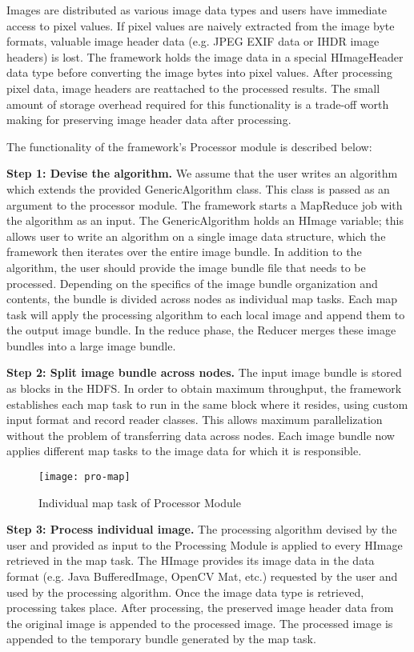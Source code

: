 Images are distributed as various image data types and users have
immediate access to pixel values.  If pixel values are naively
extracted from the image byte formats, valuable image header data
(e.g. JPEG EXIF data or IHDR \cite{David03} image headers) is
lost. The framework holds the image data in a special HImageHeader
data type before converting the image bytes into pixel values.  After
processing pixel data, image headers are reattached to the processed
results.  The small amount of storage overhead required for this
functionality is a trade-off worth making for preserving
image header data after processing.

The functionality of the framework's Processor module is described
below:

\textbf{Step 1: Devise the algorithm.} We assume that the user writes
an algorithm which extends the provided GenericAlgorithm class. This
class is passed as an argument to the processor module. The framework
starts a MapReduce job with the algorithm as an input. The
GenericAlgorithm holds an HImage variable; this allows user to write
an algorithm on a single image data structure, which the framework
then iterates over the entire image bundle. In addition to the
algorithm, the user should provide the image bundle file that needs to
be processed.  Depending on the specifics of the image bundle
organization and contents, the bundle is divided across nodes as
individual map tasks. Each map task will apply the processing
algorithm to each local image and append them to the output
image bundle. In the reduce phase, the Reducer merges these image
bundles into a large image bundle.

\textbf{Step 2: Split image bundle across nodes.} The input image
bundle is stored as blocks in the HDFS.  In order to obtain maximum
throughput, the framework establishes each map task to run in the same
block where it resides, using custom input format and record reader
classes. This allows maximum parallelization without the problem of
transferring data across nodes.  Each image bundle now applies
different map tasks to the image data for which it is responsible.

\begin{figure}[h]
	\centering
	\texttt{[image: pro-map]}
	\caption{Individual map task of Processor Module}
	\label{fig:pro-map}
\end{figure}

\textbf{Step 3: Process individual image.}  The processing algorithm
devised by the user and provided as input to the Processing Module is
applied to every HImage retrieved in the map task.  The HImage
provides its image data in the data format (e.g. Java BufferedImage,
OpenCV Mat, etc.) requested by the user and used by the processing
algorithm. Once the image data type is retrieved, processing takes
place. After processing, the preserved image header data from the
original image is appended to the processed image. The processed image
is appended to the temporary bundle generated by the map task.


